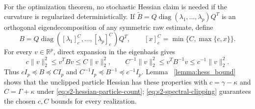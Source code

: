 For the optimization theorem, no stochastic Hessian claim is needed if the
curvature is regularized deterministically.  If
$\widetilde B=Q\operatorname{diag}(\lambda_1,\ldots,\lambda_p)Q^T$ is an
orthogonal eigendecomposition of any symmetric raw estimate, define
\begin{equation}
B=Q\operatorname{diag}([\lambda_1]_c^C,\ldots,[\lambda_p]_c^C)Q^T,
\qquad [x]_c^C=\min\{C,\max\{c,x\}\}.                          \label{eq:s2-spectral-clipping}
\end{equation}
For every $v\in\mathbb R^p$, direct expansion in the eigenbasis gives
\begin{equation}
c\|v\|_2^2\leq v^TBv\leq C\|v\|_2^2,
\qquad
C^{-1}\|v\|_2^2\leq v^TB^{-1}v\leq c^{-1}\|v\|_2^2.         \label{eq:s2-preconditioner-bounds}
\end{equation}
Thus $cI_p\preceq B\preceq CI_p$ and
$C^{-1}I_p\preceq B^{-1}\preceq c^{-1}I_p$.  Lemma~
\ref{lemma:hess_bound} shows that the unclipped particle Hessian has these
properties with $c=\gamma-\kappa$ and $C=\Gamma+\kappa$ under
\eqref{eq:s2-hessian-particle-count}; \eqref{eq:s2-spectral-clipping}
guarantees the chosen $c,C$ bounds for every realization.

